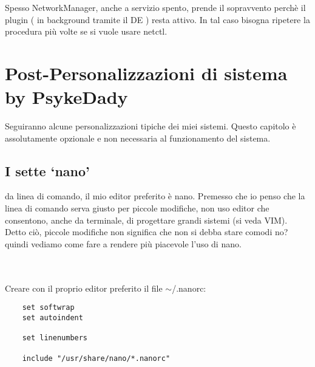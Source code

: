 \documentclass[twoside,italian]{book}
\newcommand{\nlinea}{
	\leavevmode
	\\
}
\begin{document}
			\begin{tcolorbox}[floatplacement=b,width=\textwidth,colback={white},title={ATTENZIONE:},colbacktitle=red,coltitle=white,colupper=red]
				Spesso NetworkManager, anche a servizio spento, prende il sopravvento perchè il plugin ( in background tramite il DE ) resta attivo. In tal caso bisogna ripetere la procedura più volte se si vuole usare netctl.
			\end{tcolorbox}

	\chapter{Post-Personalizzazioni di sistema by PsykeDady}
	
		Seguiranno alcune personalizzazioni tipiche dei miei sistemi. Questo capitolo è assolutamente opzionale e non necessaria al funzionamento del sistema.
		
		\section{I sette `nano'}
			
			da linea di comando, il mio editor preferito è nano. Premesso che io penso che la linea di comando serva giusto per piccole modifiche, non uso editor che consentono, anche da terminale, di progettare grandi sistemi (si veda VIM).\\
			Detto ciò, piccole modifiche non significa che non si debba stare comodi no? quindi vediamo come fare a rendere più piacevole l'uso di nano.
			\nlinea
			\nlinea
			Creare con il proprio editor preferito il file $\sim$/.nanorc:
\begin{lstlisting}
	set softwrap
	set autoindent
	
	set linenumbers
	
	include "/usr/share/nano/*.nanorc"
\end{lstlisting}
			
\end{document}
